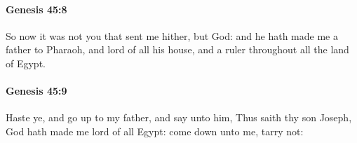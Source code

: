 		\paragraph{Genesis 45:8} %
			\label{GENESIS-45-8}

			So now it was not you that sent me hither, but God: and he hath made me a father to Pharaoh, and lord of all his house, and a ruler throughout all the land of Egypt.


		\paragraph{Genesis 45:9} %
			\label{GENESIS-45-9}

			Haste ye, and go up to my father, and say unto him, Thus saith thy son Joseph, God hath made me lord of all Egypt: come down unto me, tarry not:


